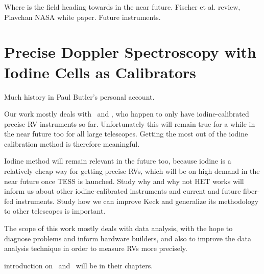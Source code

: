 Where is the field heading towards in the near future. Fischer et
al. review, Plavchan NASA white paper. Future instruments.

\section{Precise Doppler Spectroscopy with Iodine Cells as
  Calibrators} 

Much history in Paul Butler's personal account.

Our work mostly deals with \het\ and \keck, who happen to only have
iodine-calibrated precise RV instruments so far. Unfortunately this
will remain true for a while in the near future too for all large
telescopes. Getting the most out of the iodine calibration method is
therefore meaningful. 

Iodine method will remain relevant in the future too,
because iodine is a relatively cheap way for getting precise RVs,
which will be on high demand in the near future once TESS is
launched. Study why and why not HET works will inform us about other
iodine-calibrated instruments and current and future fiber-fed
instruments. Study how we can improve Keck and generalize its methodology
to other telescopes is important.

The scope of this work mostly deals with data analysis, with the hope
to diagnose problems and inform hardware builders, and also to improve
the data analysis technique in order to measure RVs more precisely.

introduction on \het\ and \keck\ will be in their chapters.